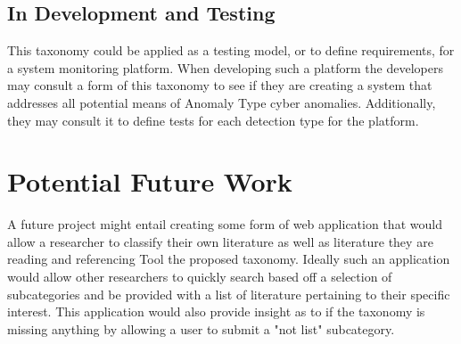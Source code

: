 \documentclass[10pt]{IEEEtran}
\begin{document}
\subsection{In Development and Testing}
This taxonomy could be applied as a testing model, or to define requirements, for a system monitoring platform. When developing such a platform the developers may consult a form of this taxonomy to see if they are creating a system that addresses all potential means of Anomaly Type cyber anomalies. Additionally, they may consult it to define tests for each detection type for the platform.

\section{Potential Future Work}
A future project might entail creating some form of web application that would allow a researcher to classify their own literature as well as literature they are reading and referencing Tool the proposed taxonomy. Ideally such an application would allow other researchers to quickly search based off a selection of subcategories and be provided with a list of literature pertaining to their specific interest. This application would also provide insight as to if the taxonomy is missing anything by allowing a user to submit a "not list" subcategory.
\end{document}
